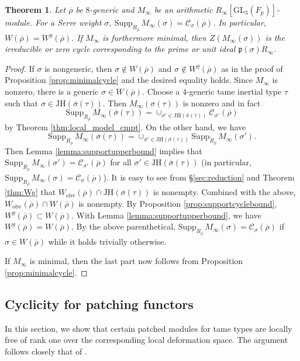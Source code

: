 \documentclass[oneside,a4paper,english, 11pt]{amsart}
\theoremstyle{plain}
\newtheorem{thm}{Theorem}[subsection]
\theoremstyle{plain}
\theoremstyle{plain}
\theoremstyle{plain}
\theoremstyle{plain}
\theoremstyle{plain}
\theoremstyle{definition}
\theoremstyle{definition}
\theoremstyle{definition}
\theoremstyle{remark}
\numberwithin{equation}{section}
\newcommand{\fp}{\mathfrak{p}}
\newcommand{\cC}{\mathcal{C}}
\newcommand{\GL}{\mathrm{GL}}
\newcommand{\JH}{\mathrm{JH}}
\newcommand{\supp}{\mathrm{Supp}}
\newcommand{\rhobar}{\overline{\rho}}
\newcommand{\ovl}[1]{\overline{#1}}
\begin{document}
\begin{thm}
\label{thm:axiomaticSWC}
Let $\rhobar$ be $8$-generic and $M_\infty$ be an arithmetic $R_\infty[\GL_3(F_p)]$-module. 
For a Serre weight $\sigma$, $\supp_{R_{\rhobar}}\, M_\infty(\sigma) = \cC_\sigma(\rhobar)$. In particular, $W(\rhobar) = W^g(\rhobar)$.
If $M_\infty$ is furthermore minimal, then $Z(M_\infty(\sigma))$ is the irreducible or zero cycle corresponding to the prime or unit ideal $\fp(\sigma)R_\infty$. 
\end{thm}
\begin{proof}
If $\sigma$ is nongeneric, then $\sigma \notin W(\rhobar)$ and $\sigma \notin W^g(\rhobar)$ as in the proof of Proposition \ref{prop:minimalcycle} and the desired equality holds. 
Since $M_\infty$ is nonzero, there is a generic $\sigma \in W(\rhobar)$. 
Choose a $4$-generic tame inertial type $\tau$ such that $\sigma \in \JH(\ovl{\sigma}(\tau))$. 
Then $M_\infty(\sigma(\tau))$ is nonzero and in fact 
\[
\supp_{R_{\rhobar}}\, M_\infty(\ovl{\sigma}(\tau)) = \cup_{\sigma'\in \JH(\ovl{\sigma}(\tau))} \cC_{\sigma'}(\rhobar)
\]
by Theorem \ref{thm:local_model_cmpt}. 
On the other hand, we have
\[
\supp_{R_{\rhobar}}\, M_\infty(\ovl{\sigma}(\tau)) = \cup_{\sigma'\in \JH(\ovl{\sigma}(\tau))} \supp_{R_{\rhobar}}\, M_\infty(\sigma').
\]
Then Lemma \ref{lemma:supportupperbound} implies that $\supp_{R_{\rhobar}}\, M_\infty(\sigma') = \cC_{\sigma'}(\rhobar)$ for all $\sigma'\in \JH(\ovl{\sigma}(\tau))$ (in particular, $\supp_{R_{\rhobar}}\, M_\infty(\sigma) = \cC_{\sigma}(\rhobar)$). 
It is easy to see from \S \ref{sec:reduction} and Theorem \ref{thm:Wg} that $W_{\mathrm{obv}}(\rhobar) \cap \JH(\ovl{\sigma}(\tau))$ is nonempty. 
Combined with the above, $W_{\mathrm{obv}}(\rhobar) \cap W(\rhobar)$ is nonempty. 
By Proposition \ref{prop:supportcyclebound}, $W^g(\rhobar) \subset W(\rhobar)$. 
With Lemma \ref{lemma:supportupperbound}, we have $W^g(\rhobar) = W(\rhobar)$. 
By the above parenthetical, $\supp_{R_{\rhobar}}\, M_\infty(\sigma) = \cC_{\sigma}(\rhobar)$ if $\sigma \in W(\rhobar)$ while it holds trivially otherwise. 

If $M_\infty$ is minimal, then the last part now follows from Proposition \ref{prop:minimalcycle}. 
\end{proof}





%

\subsection{Cyclicity for patching functors}
\label{sec:cyc}
In this section, we show that certain patched modules for tame types are locally free of rank one over the corresponding local deformation space.
The argument follows closely that of \cite[\S 5.2]{LLLM2}.
\end{document}
